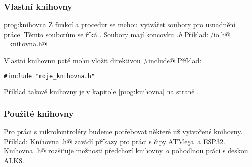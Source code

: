 \subsubsection{Vlastní knihovny} prog:knihovna
Z funkcí a procedur se mohou vytvářet soubory pro usnadnění práce. Těmto souborům se říká  . 
  Soubory mají koncovku \textit{.h}
Příklad: \verb@avr/io.h@
\verb@moje_knihovna.h@

Vlastní knihovnu poté mohu vložit direktivou \verb@#include@
Příklad:
\begin{verbatim}
#include "moje_knihovna.h"
\end{verbatim} 

Příklad takové knihovny je v kapitole \ref{prog:knihovna} na straně \pageref{prog:knihovna}.

\subsubsection{Použité knihovny}  

Pro práci s mikrokontroléry budeme potřebovat některé už vytvořené knihovny.
Příklad: 
Knihovna \verb@Arduino.h@ zavádí příkazy pro práci s čipy ATMega~a ESP32.
Knihovna \verb@Learningkit.h@  rozšiřuje možnosti předchozí knihovny~o pohodlnou práci s deskou ALKS.


 

